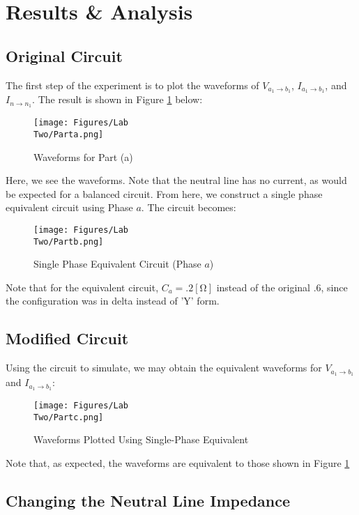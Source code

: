 \documentclass[
	letterpaper, %
	10pt, %
]{CSUniSchoolLabReport}
\begin{document}
\section{Results \& Analysis} 

\subsection{Original Circuit}

The first step of the experiment is to plot the waveforms of $V_{a_1\to b_1}$, $I_{a_1\to b_1}$, and $I_{n\to n_1}$. The result is shown in Figure \ref{fig:2} below:

  \begin{figure}[H]
    \centering
    \texttt{[image: Figures/Lab\\ Two/Parta.png]}
    \caption{Waveforms for Part (a)}
    \label{fig:2}
  \end{figure}

  Here, we see the waveforms. Note that the neutral line has no current, as would be expected for a balanced circuit. From here, we construct a single phase equivalent circuit using Phase $a$. The circuit becomes:

  \begin{figure}[H]
    \centering
    \texttt{[image: Figures/Lab\\ Two/Partb.png]}
    \caption{Single Phase Equivalent Circuit (Phase $a$)}
    \label{fig:3}
  \end{figure}

  Note that for the equivalent circuit, $C_a=.2[\si{\ohm}]$ instead of the original .6, since the configuration was in delta instead of 'Y' form.

\subsection{Modified Circuit}

Using the circuit to simulate, we may obtain the equivalent waveforms for $V_{a_1\to b_1}$ and $I_{a_1\to b_1}$:

\begin{figure}[H]
  \centering
  \texttt{[image: Figures/Lab\\ Two/Partc.png]}
  \caption{Waveforms Plotted Using Single-Phase Equivalent}
  \label{fig:4}
\end{figure}

Note that, as expected, the waveforms are equivalent to those shown in Figure \ref{fig:2}

\subsection{Changing the Neutral Line Impedance}
\end{document}
